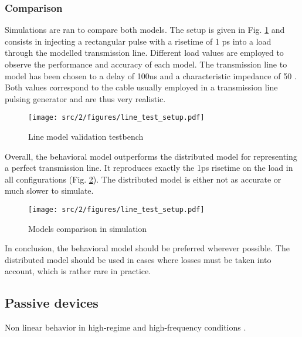 \inputminted[frame=single,label={VHDL-AMS transmission line model}]{VHDL}{src/2/snippets/tline.vhdl}

\subsubsection{Comparison}

Simulations are ran to compare both models.
The setup is given in Fig. \ref{fig:lines-testbench} and consists in injecting a rectangular pulse with a risetime of 1 ps into a load through the modelled transmission line.
Different load values are employed to observe the performance and accuracy of each model.
The transmission line to model has been chosen to a delay of 100ns and a characteristic impedance of 50 \textOmega.
Both values correspond to the cable usually employed in a transmission line pulsing generator and are thus very realistic.

\begin{figure}[!h]
  \centering
  \texttt{[image: src/2/figures/line\_test\_setup.pdf]}
  \caption{Line model validation testbench}
  \label{fig:lines-testbench}
\end{figure}

Overall, the behavioral model outperforms the distributed model for representing a perfect transmission line.
It reproduces exactly the 1ps risetime on the load in all configurations (Fig. \ref{fig:lines-simulations}).
The distributed model is either not as accurate or much slower to simulate.


\begin{figure}[!h]
  \centering
  \texttt{[image: src/2/figures/line\_test\_setup.pdf]}
  \caption{Models comparison in simulation}
  \label{fig:lines-simulations}
\end{figure}

In conclusion, the behavioral model should be preferred wherever possible.
The distributed model should be used in cases where losses must be taken into account, which is rather rare in practice.

\subsection{Passive devices}

Non linear behavior in high-regime and high-frequency conditions \cite{capa-esd-cz}.

